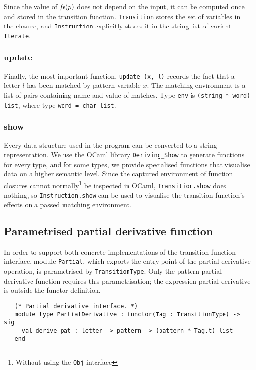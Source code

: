 Since the value of $\mathit{fv}(p)$ does not depend on the input, it can be computed
once and stored in the transition function. \texttt{Transition} stores the set
of variables in the closure, and \texttt{Instruction} explicitly stores it in
the string list of variant \texttt{Iterate}.

\subsubsection{update}

Finally, the most important function, \texttt{update (x, l)} records the fact
that a letter $l$ has been matched by pattern variable $x$. The matching
environment is a list of pairs containing name and value of matches. Type
\texttt{env} is \texttt{(string * word) list}, where type \texttt{word = char
list}.

\subsubsection{show}

Every data structure used in the program can be converted to a string
representation. We use the OCaml library \texttt{Deriving\_Show} to generate
functions for every type, and for some types, we provide specialised functions
that visualise data on a higher semantic level. Since the captured environment
of function closures cannot normally\footnote{Without using the \texttt{Obj}
interface} be inspected in OCaml, \texttt{Transition.show} does nothing, so
\texttt{Instruction.show} can be used to visualise the transition function's
effects on a passed matching environment.

\subsection{Parametrised partial derivative function}

In order to support both concrete implementations of the transition function
interface, module \texttt{Partial}, which exports the entry point of the partial
derivative operation, is parametrised by \texttt{TransitionType}. Only the
pattern partial derivative function requires this parametrisation; the
expression partial derivative is outside the functor definition.

\begin{lstlisting}
   (* Partial derivative interface. *)
   module type PartialDerivative : functor(Tag : TransitionType) -> sig
     val derive_pat : letter -> pattern -> (pattern * Tag.t) list
   end
\end{lstlisting}

